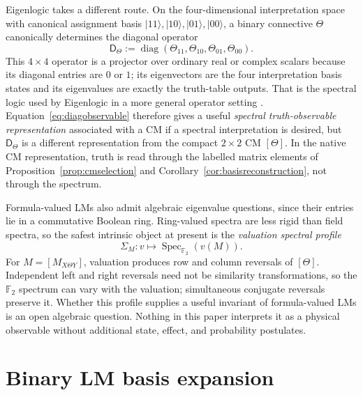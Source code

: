 \documentclass[11pt]{article}
\theoremstyle{definition}
\theoremstyle{remark}
\newcommand{\F}{\mathbb F}
\begin{document}
Eigenlogic takes a different route.  On the four-dimensional interpretation space with canonical assignment basis $|11\rangle,|10\rangle,|01\rangle,|00\rangle$, a binary connective $\Theta$ canonically determines the diagonal operator
\begin{equation}
 \mathsf D_\Theta
 :=\operatorname{diag}(\Theta_{11},\Theta_{10},\Theta_{01},\Theta_{00}).
 \label{eq:diagobservable}
\end{equation}
This $4\times4$ operator is a projector over ordinary real or complex scalars because its diagonal entries are $0$ or $1$; its eigenvectors are the four interpretation basis states and its eigenvalues are exactly the truth-table outputs.  That is the spectral logic used by Eigenlogic in a more general operator setting \cite{Toffano2015,DuboisToffano2016}.  Equation~\eqref{eq:diagobservable} therefore gives a useful \emph{spectral truth-observable representation} associated with a CM if a spectral interpretation is desired, but $\mathsf D_\Theta$ is a different representation from the compact $2\times2$ CM $[\Theta]$.  In the native CM representation, truth is read through the labelled matrix elements of Proposition~\ref{prop:cmselection} and Corollary~\ref{cor:basisreconstruction}, not through the spectrum.

Formula-valued LMs also admit algebraic eigenvalue questions, since their entries lie in a commutative Boolean ring.  Ring-valued spectra are less rigid than field spectra, so the safest intrinsic object at present is the \emph{valuation spectral profile}
\begin{equation}
 \Sigma_M:v\longmapsto\operatorname{Spec}_{\F_2}(v(M)).
 \label{eq:valspectralprofile}
\end{equation}
For $M=[M_{X\Theta Y}]$, valuation produces row and column reversals of $[\Theta]$.  Independent left and right reversals need not be similarity transformations, so the $\F_2$ spectrum can vary with the valuation; simultaneous conjugate reversals preserve it.  Whether this profile supplies a useful invariant of formula-valued LMs is an open algebraic question.  Nothing in this paper interprets it as a physical observable without additional state, effect, and probability postulates.




\section{Binary LM basis expansion}
\label{app:basis}
\end{document}
